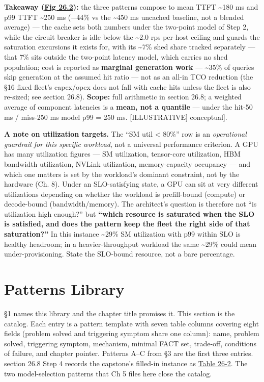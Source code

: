 \textbf{Takeaway (\hyperref[fig:26.2]{Fig 26.2}):} the three patterns compose to mean TTFT
\textasciitilde180 ms and p99 TTFT \textasciitilde250 ms (−44\% vs the
\textasciitilde450 ms uncached baseline, not a blended average) --- the
cache sets both numbers under the two-point model of Step 2, while the
circuit breaker is idle below the \textasciitilde2.0 rps per-host
ceiling and guards the saturation excursions it exists for, with its
\textasciitilde7\% shed share tracked separately --- that 7\% sits
outside the two-point latency model, which carries no shed population;
cost is reported as \textbf{marginal generation work} ---
\textasciitilde35\% of queries skip generation at the assumed hit ratio
--- not as an all-in TCO reduction (the §16 fixed fleet's capex/opex
does not fall with cache hits unless the fleet is also re-sized; see
section 26.8). \textbf{Scope:} full arithmetic in section 26.8; a
weighted average of component latencies is a \textbf{mean, not a
quantile} --- under the hit-50 ms / miss-250 ms model p99 = 250 ms.
\mbox{{[}ILLUSTRATIVE{]}} conceptual{]}.

\textbf{A note on utilization targets.} The ``SM util \textless{} 80\%''
row is an \emph{operational guardrail for this specific workload}, not a
universal performance criterion. A GPU has many utilization figures ---
SM utilization, tensor-core utilization, HBM bandwidth utilization,
NVLink utilization, memory-capacity occupancy --- and which one matters
is set by the workload's dominant constraint, not by the hardware (Ch.
8). Under an SLO-satisfying state, a GPU can sit at very different
utilizations depending on whether the workload is prefill-bound
(compute) or decode-bound (bandwidth/memory). The architect's question
is therefore not ``is utilization high enough?'' but \textbf{``which
resource is saturated when the SLO is satisfied, and does the pattern
keep the fleet the right side of that saturation?''} In this instance
\textasciitilde29\% SM utilization with p99 within SLO is healthy
headroom; in a heavier-throughput workload the same \textasciitilde29\%
could mean under-provisioning. State the SLO-bound resource, not a bare
percentage.

\section{Patterns Library}\label{patterns-library}

§1 names this library and the chapter title promises it. This section is
the catalog. Each entry is a pattern template with seven table columns
covering eight fields (problem solved and triggering symptom share one
column): name, problem solved, triggering symptom, mechanism, minimal
FACT set, trade-off, conditions of failure, and chapter pointer.
Patterns A--C from §3 are the first three entries. section 26.8 Step 4
records the capstone's filled-in instance as \hyperref[tab:26.2]{Table 26-2}. The two
model-selection patterns that Ch 5 files here close the catalog.

